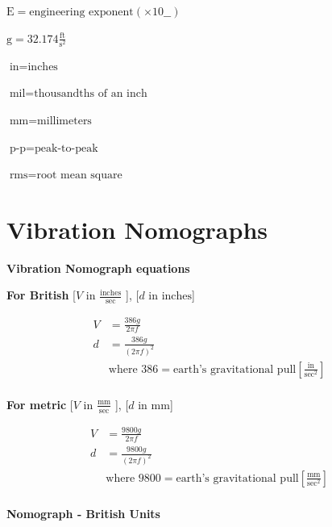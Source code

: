 \documentclass[
]{book}
\begin{document}
\(\mathrm{E} = \text{engineering exponent} \left(\times 10 \_\_ \right)\)

\(\text{g} = 32.174 \frac{\text{ft}}{\text{s}^2}\)

\(\text{in} = \text{inches}\)

\(\text{mil} = \text{thousandths of an inch}\)

\(\text{mm} = \text{millimeters}\)

\(\text{p-p} = \text{peak-to-peak}\)

\(\text{rms} = \text{root mean square}\)

\hypertarget{vibration-nomographs}{%
\section{Vibration Nomographs}\label{vibration-nomographs}}

\textbf{Vibration Nomograph equations}

\textbf{For British} {[}\(V\) in \(\frac{\text{inches}}{\text{sec}}\) {]}, {[}\(d\) in \(\text{inches}\){]}

\begin{align}
V &= \frac{386 g}{2 \pi f} \\
d &= \frac{386 g}{\left( 2 \pi f \right)^2} \\
&\text{where } 386 = \text{earth's gravitational pull} \left[ \frac{\text{in}}{\text{sec}^2}  \right] \\
\end{align}

\textbf{For metric} {[}\(V\) in \(\frac{\text{mm}}{\text{sec}}\) {]}, {[}\(d\) in \(\text{mm}\){]}

\begin{align}
V &= \frac{9800 g}{2 \pi f} \\
d &= \frac{9800 g}{\left( 2 \pi f \right)^2} \\
&\text{where } 9800 = \text{earth's gravitational pull} \left[ \frac{\text{mm}}{\text{sec}^2}  \right] \\
\end{align}

\textbf{Nomograph - British Units}
\end{document}

